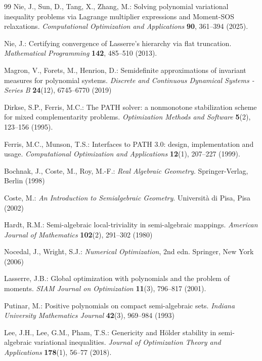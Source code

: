 \documentclass[sn-basic,Numbered]{sn-jnl}
\theoremstyle{thmstyleone}%
\begin{document}
\begin{thebibliography}{99}
Nie, J., Sun, D., Tang, X., Zhang, M.: Solving polynomial variational inequality problems via Lagrange multiplier expressions and Moment-SOS relaxations. \emph{Computational Optimization and Applications} \textbf{90}, 361--394 (2025).

Nie, J.: Certifying convergence of Lasserre’s hierarchy via flat truncation. \emph{Mathematical Programming} \textbf{142}, 485--510 (2013). 



Magron, V., Forets, M., Henrion, D.: Semidefinite approximations of invariant measures for polynomial systems. \emph{Discrete and Continuous Dynamical Systems - Series B} \textbf{24}(12), 6745--6770 (2019)

Dirkse, S.P., Ferris, M.C.: The PATH solver: a nonmonotone stabilization scheme for mixed complementarity problems. \emph{Optimization Methods and Software} \textbf{5}(2), 123--156 (1995). 

Ferris, M.C., Munson, T.S.: Interfaces to PATH 3.0: design, implementation and usage. \emph{Computational Optimization and Applications} \textbf{12}(1), 207--227 (1999). 

Bochnak, J., Coste, M., Roy, M.-F.: \emph{Real Algebraic Geometry}. Springer-Verlag, Berlin (1998)

Coste, M.: \emph{An Introduction to Semialgebraic Geometry}. Universit\`a di Pisa, Pisa (2002)

Hardt, R.M.: Semi-algebraic local-triviality in semi-algebraic mappings. \emph{American Journal of Mathematics} \textbf{102}(2), 291--302 (1980)

Nocedal, J., Wright, S.J.: \emph{Numerical Optimization}, 2nd edn. Springer, New York (2006)

Lasserre, J.B.: Global optimization with polynomials and the problem of moments. \emph{SIAM Journal on Optimization} \textbf{11}(3), 796--817 (2001). 

Putinar, M.: Positive polynomials on compact semi-algebraic sets. \emph{Indiana University Mathematics Journal} \textbf{42}(3), 969--984 (1993)

Lee, J.H., Lee, G.M., Pham, T.S.: Genericity and H\"older stability in semi-algebraic variational inequalities. \emph{Journal of Optimization Theory and Applications} \textbf{178}(1), 56--77 (2018). 


\end{thebibliography}
\end{document}
